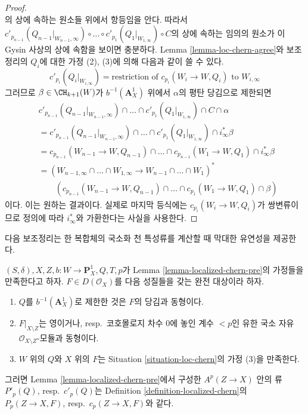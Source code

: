 \begin{proof}
$$$$
의 상에 속하는 원소들 위에서 항등임을 안다. 따라서
$c'_{p_{n - 1}}(Q_{n - 1}|_{W_{n - 1}, \infty}) \circ \ldots \circ
c'_{p_1}(Q_1|_{W_{1, \infty}}) \circ C$의 상에 속하는 임의의 원소가
이 Gysin 사상의 상에 속함을 보이면 충분하다. Lemma
\ref{lemma-loc-chern-agree}와 보조정리의 $Q_i$에 대한 가정 (2), (3)에
의해 다음과 같이 쓸 수 있다.
$$
c'_{p_i}(Q_i|_{W_{i, \infty}}) = \text{restriction of } c_{p_i}(W_i \to W, Q_i)
\text{ to } W_{i, \infty}
$$
그러므로 $\beta \in \CH_{k + 1}(W)$가 $b^{-1}(\mathbf{A}^1_X)$ 위에서
$\alpha$의 평탄 당김으로 제한되면
\begin{align*}
& c'_{p_{n - 1}}(Q_{n - 1}|_{W_{n - 1}, \infty}) \cap \ldots \cap
c'_{p_1}(Q_1|_{W_{1, \infty}})
\cap C \cap \alpha \\
& =
c'_{p_{n - 1}}(Q_{n - 1}|_{W_{n - 1}, \infty}) \cap \ldots \cap
c'_{p_1}(Q_1|_{W_{1, \infty}})
\cap i_\infty^* \beta \\
& =
c_{p_{n - 1}}(W_{n - 1} \to W, Q_{n - 1}) \cap \ldots \cap
c_{p_{n - 1}}(W_1 \to W, Q_1) \cap i_\infty^* \beta \\
& =
(W_{n - 1, \infty} \cap \ldots \cap W_{1, \infty} \to
W_{n - 1} \cap \ldots \cap W_1)^*
\\ &\qquad
\left(c_{p_{n - 1}}(W_{n - 1} \to W, Q_{n - 1}) \cap \ldots \cap
c_{p_1}(W_1 \to W, Q_1) \cap \beta\right)
\end{align*}
이다. 이는 원하는 결과이다. 실제로 마지막 등식에는
$c_{p_i}(W_i \to W, Q_i)$가 쌍변류이므로 정의에 따라
$i_\infty^*$와 가환한다는 사실을 사용한다.
\end{proof}

\noindent
다음 보조정리는 한 복합체의 국소화 천 특성류를 계산할 때 막대한
유연성을 제공한다.

\begin{lemma}
\label{lemma-independent-loc-chern-bQ}
$(S, \delta), X, Z, b : W \to \mathbf{P}^1_X, Q, T, p$가 Lemma
\ref{lemma-localized-chern-pre}의 가정들을 만족한다고 하자.
$F \in D(\mathcal{O}_X)$를 다음 성질들을 갖는 완전 대상이라 하자.
\begin{enumerate}
\item $Q$를 $b^{-1}(\mathbf{A}^1_X)$로 제한한 것은 $F$의 당김과
동형이다.
\item $F|_{X \setminus Z}$는 영이거나, resp.\ 코호몰로지 차수 $0$에
놓인 계수 $< p$인 유한 국소 자유
$\mathcal{O}_{X \setminus Z}$-모듈과 동형이다.
\item $W$ 위의 $Q$와 $X$ 위의 $F$는 Situation
\ref{situation-loc-chern}의 가정 (3)을 만족한다.
\end{enumerate}
그러면 Lemma \ref{lemma-localized-chern-pre}에서 구성한
$A^p(Z \to X)$ 안의 류 $P'_p(Q)$, resp.\ $c'_p(Q)$는 Definition
\ref{definition-localized-chern}의 $P_p(Z \to X, F)$,
resp.\ $c_p(Z \to X, F)$와 같다.
\end{lemma}

